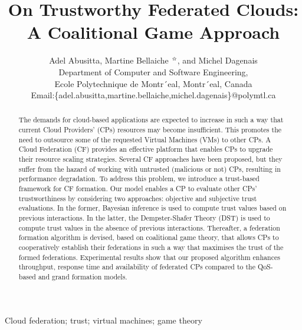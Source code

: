 \documentclass[preprint]{elsarticle}
\theoremstyle{definition}
\theoremstyle{remark}
\theoremstyle{property}
\begin{document}
\title{On Trustworthy Federated Clouds: A Coalitional
Game Approach}

\author{Adel Abusitta, Martine Bellaiche$\tnoteref{t2}$, and Michel Dagenais\\
Department of Computer and Software Engineering,\\ Ecole Polytechnique de Montr´eal, Montr´eal, Canada\\
Email:\{adel.abusitta,martine.bellaiche,michel.dagenais\}@polymtl.ca}

\begin{abstract}
The demands for cloud-based applications are expected to increase in such a way that current Cloud Providers' (CPs) resources may become insufficient. This promotes the need to outsource some of the requested Virtual Machines (VMs) to other CPs. A Cloud Federation (CF) provides an effective platform that enables CPs to upgrade their resource scaling strategies. Several CF approaches have been proposed, but they suffer from the hazard of working with untrusted (malicious or not) CPs, resulting in performance degradation. To address this problem, we introduce a trust-based framework for CF formation. Our model enables a CP to evaluate other CPs' trustworthiness by considering two
approaches: objective and subjective trust evaluations. In the former, Bayesian inference is used to compute trust values based on previous interactions. In the latter, the Dempster-Shafer Theory (DST) is used to compute trust values in the absence of previous interactions. Thereafter, a federation formation algorithm is devised, based on coalitional game theory, that allows CPs to cooperatively establish their federations in such a way that maximises the trust of the formed federations. Experimental results show that our proposed algorithm enhances throughput, response time and availability of federated CPs compared to the QoS-based and grand formation models.

\end{abstract}

\begin{keyword}
Cloud federation; trust; virtual machines; game theory
\end{keyword}


\maketitle
\end{document}
